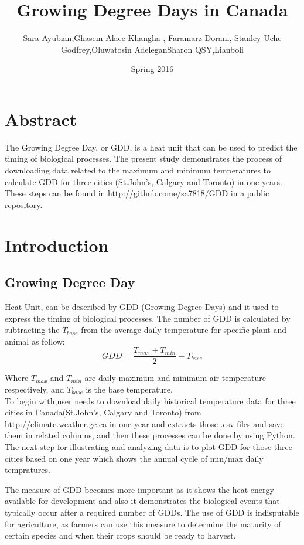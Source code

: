 \documentclass[DIV=calc, paper=a4, fontsize=11pt, twocolumn]{scrartcl}
\title{Growing Degree Days in Canada}
\author{Sara Ayubian\affmark[1]    ,Ghasem Alaee Khangha \affmark[1],    Faramarz Dorani\affmark[1],
Stanley Uche Godfrey\affmark[1],Oluwatosin Adelegan\affmark[1]
Sharon QSY\affmark[1],Lianboli\affmark[1]}
\date{Spring 2016}
\newcommand{\initial}[1]{ 
\lettrine[lines=3,lhang=0.3,nindent=0em]{
\color{DarkGoldenrod}
{\textsf{#1}}}{}}
\begin{document}
\maketitle 
\thispagestyle{fancy} 
\section{Abstract}

\initial{T}he Growing Degree Day, or GDD, is a heat unit that can be used to predict the timing of biological processes. The present study demonstrates the process of downloading data related to the maximum and minimum temperatures to calculate GDD for three cities (St.John's, Calgary and Toronto) in one years. These steps can be found in http://github.come/sa7818/GDD in a public repository.
	
	
	
\section{Introduction}
\subsection{Growing Degree Day}

Heat Unit, can be described by GDD (Growing Degree Days) and it used to express the timing of biological processes. The number of GDD is calculated by subtracting the $T_{base}$ from the average daily temperature for specific plant and animal as follow:
\begin{equation}
GDD =\frac {T_{max}+T_{min}}{2}-T_{base}
\end{equation}

Where $T_{max}$ and $T_{min}$ are daily maximum and minimum air temperature respectively, and $T_{base}$ is the base temperature.\\
To begin with,user needs to download daily historical temperature data for three cities in Canada(St.John's, Calgary and Toronto) from http://climate.weather.gc.ca in one year and extracts those .csv files and save them in related columns, and then these processes can be done by using Python.
The next step for illustrating and analyzing data is to plot GDD for those three cities based on one year which shows the annual cycle of min/max daily tempratures.

The measure of GDD becomes more important as it shows the heat energy available for development and also it demonstrates the biological events that typically occur after a required number of GDDs. The use of GDD is indisputable for agriculture, as farmers can use this measure to determine the maturity of certain species and when their crops should be ready to harvest.
\end{document}
